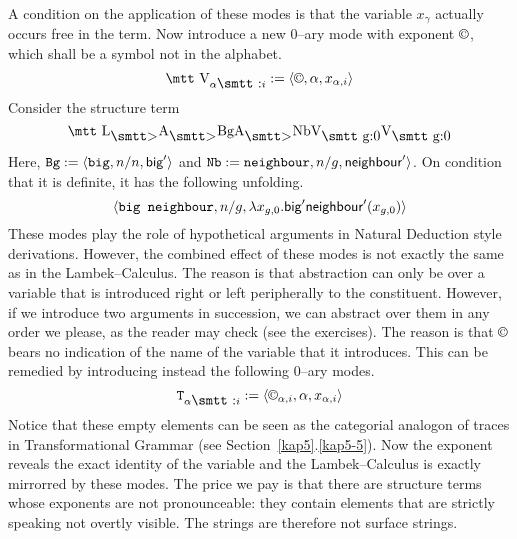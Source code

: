 A condition on the application of these modes is that the
variable $x_{\gamma}$ actually occurs free in the term.
Now introduce a new 0--ary mode with exponent $\copyright$,
which shall be a symbol not in the alphabet.
\begin{equation}
\mbox{\mtt V}_{\alpha\mbox{\smtt :}i} := \auf \copyright, \alpha,
    x_{\alpha,i}\zu
\end{equation}
Consider the structure term
\begin{equation}
\mbox{\mtt L$_{\sgr}$A$_{\sgr}$BgA$_{\sgr}$NbV$_{\mbox{\smtt g:0}}$%
V$_{\mbox{\smtt g:0}}$}
\end{equation}
Here, $\mbox{\tt Bg} := \langle \mbox{\tt big}, n/n, \textsf{big}'\rangle$ 
and $\mbox{\tt Nb} := \mbox{\tt neighbour}, n/g, \textsf{neighbour}'\rangle$.
On condition that it is definite, it has the following unfolding.
\begin{equation}
\langle \mbox{\tt big neighbour}, n/g,
    \lambda x_{g,0}.\textsf{big}'\textsf{neighbour}'(x_{g,0})\rangle
\end{equation}
These modes play the role of hypothetical arguments in
Natural Deduction style derivations. However, the combined
effect of these modes is not exactly the same as in the
Lambek--Calculus. The reason is that abstraction can only be
over a variable that is introduced right or left peripherally
to the constituent. However, if we introduce two arguments in
succession, we can abstract over them in any order we please,
as the reader may check (see the exercises). The reason is
that $\copyright$ bears no indication of the name of the variable
that it introduces.  This can be remedied by introducing instead
the following 0--ary modes.
\begin{equation}
\mbox{\tt T}_{\alpha\mbox{\smtt :}i} := \auf \copyright_{\alpha,i}, \alpha,
    x_{\alpha,i}\zu
\end{equation}
Notice that these empty elements can be seen as the categorial
analogon of traces in Transformational Grammar (see
Section~\ref{kap5}.\ref{kap5-5}). Now the exponent reveals the exact
identity of the variable and the Lambek--Calculus is exactly
mirrorred by these modes. The price we pay is that there are
structure terms whose exponents are not pronounceable: they
contain elements that are strictly speaking not overtly visible.
The strings are therefore not surface strings. 

